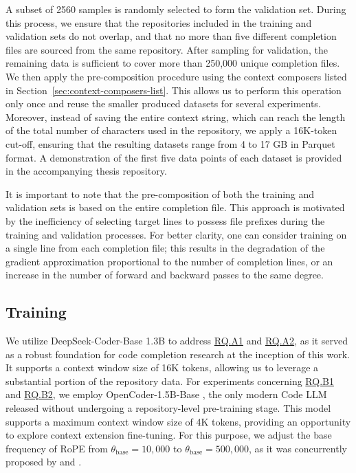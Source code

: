 A subset of 2560 samples is randomly selected to form the validation set. During this process, we ensure that the repositories included in the training and validation sets do not overlap, and that no more than five different completion files are sourced from the same repository. After sampling for validation, the remaining data is sufficient to cover more than 250,000 unique completion files. We then apply the pre-composition procedure using the context composers listed in Section~\ref{sec:context-composers-list}. This allows us to perform this operation only once and reuse the smaller produced datasets for several experiments. Moreover, instead of saving the entire context string, which can reach the length of the total number of characters used in the repository, we apply a 16K-token cut-off, ensuring that the resulting datasets range from 4 to 17 GB in Parquet format. A demonstration of the first five data points of each dataset is provided in the accompanying thesis repository.

It is important to note that the pre-composition of both the training and validation sets is based on the entire completion file. This approach is motivated by the inefficiency of selecting target lines to possess file prefixes during the training and validation processes. For better clarity, one can consider training on a single line from each completion file; this results in the degradation of the gradient approximation proportional to the number of completion lines, or an increase in the number of forward and backward passes to the same degree.

\subsection{Training}

We utilize DeepSeek-Coder-Base 1.3B \parencite{guo2024} to address \hyperref[rq:rq-a1]{RQ.A1} and \hyperref[rq:rq-a2]{RQ.A2}, as it served as a robust foundation for code completion research at the inception of this work. It supports a context window size of 16K tokens, allowing us to leverage a substantial portion of the repository data. For experiments concerning \hyperref[rq:rq-b1]{RQ.B1} and \hyperref[rq:rq-b2]{RQ.B2}, we employ OpenCoder-1.5B-Base \parencite{huang2024}, the only modern Code LLM released without undergoing a repository-level pre-training stage. This model supports a maximum context window size of 4K tokens, providing an opportunity to explore context extension fine-tuning. For this purpose, we adjust the base frequency of RoPE from \(\theta_{\mathrm{base}} = 10{,}000\) to \(\theta_{\mathrm{base}} = 500{,}000\), as it was concurrently proposed by \citet{rozière2023} and \citet{xiong2023}. %

